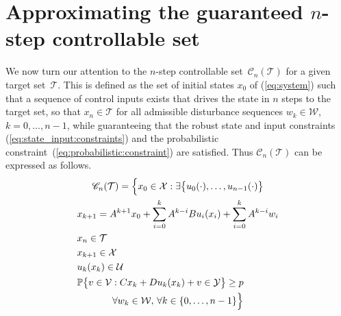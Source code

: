 \documentclass{ifacconf}
\providecommand{\C}{\mathscr C}
\providecommand{\W}{\mathcal W}
\providecommand{\V}{\mathcal V}
\providecommand{\X}{\mathcal X}
\providecommand{\Y}{\mathcal Y}
\providecommand{\U}{\mathcal U}
\providecommand{\T}{\mathcal T}
\providecommand{\PP}{\mathbb P}
\begin{document}
\section{Approximating the guaranteed $n$-step controllable set}\label{ssec:approximating:n:step}
%
We now turn our attention to the $n$-step controllable set~$\C_n(\T)$ for a given target set~$\T$.
%
%
This is defined as the set of initial states $x_0$ of (\ref{eq:system}) such that a sequence of control inputs exists that drives the state in $n$ steps to the target set, so that $x_n\in\T$ for all admissible disturbance sequences 
$w_k\in\W$, $k=0,\ldots,n-1$, while guaranteeing that the robust state and input constraints 
(\ref{eq:state_input:constraints}) and the probabilistic constraint~(\ref{eq:probabilistic:constraint}) are satisfied.
%
Thus $\C_n(\T)$ can be expressed as follows.
%
\begin{multline*}
\C_n(\T) = \Bigl\{x_0\in\X: \exists \bigl\{u_0(\cdot),\ldots,u_{n-1}(\cdot)\bigr\}\\
\begin{aligned}
&x_{k+1} = A^{k+1} x_0 + \sum_{i=0}^{k} A^{k-i}B u_{i}(x_{i}) + \sum_{i=0}^{k} A^{k-i} w_{i}\\
&x_n\in\T\\
&x_{k+1}\in\X\\
&u_k(x_k)\in\U\\
&\PP\bigl\{v\in\V : Cx_k + Du_k(x_k) +v \in\Y\bigr\}\geq p
\end{aligned}\\
\forall w_k\in\W,\, \forall k\in\{ 0, \ldots , n-1\} \Bigr\}	
\end{multline*}
\end{document}
